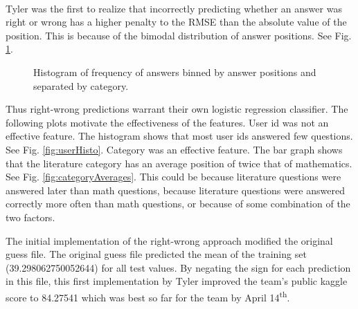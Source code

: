 \documentclass[letterpaper]{article}
\begin{document}
\paragraph{} Tyler was the first to realize that incorrectly predicting whether an answer was right or wrong has a higher penalty to the RMSE than the absolute value of the position. This is because of the bimodal distribution of answer positions. See Fig. \ref{fig:categoryPositions}.


\begin{figure}[H]
	\begin{center}
	\end{center}
	\caption{Histogram of frequency of answers binned by answer positions and separated by category.}
	\label{fig:categoryPositions}
\end{figure}

Thus right-wrong predictions warrant their own logistic regression classifier. The following plots motivate the effectiveness of the features. User id was not an effective feature. The histogram shows that most user ids answered few questions. See Fig. \ref{fig:userHisto}. Category was an effective feature. The bar graph shows that the literature category has an average position of twice that of mathematics. See Fig. \ref{fig:categoryAverages}. This could be because literature questions were answered later than math questions, because literature questions were answered correctly more often than math questions, or because of some combination of the two factors. 

The initial implementation of the right-wrong approach modified the original guess file. The original guess file predicted the mean of the training set (39.298062750052644) for all test values. By negating the sign for each prediction in this file, this first implementation by Tyler improved the team's public kaggle score to 84.27541 which was best so far for the team by April 14\textsuperscript{th}.
\end{document}
